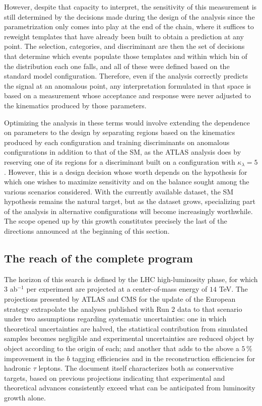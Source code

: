 However, despite that capacity to interpret, the sensitivity of this measurement is still determined by the decisions made during the design of the analysis since the parametrization only comes into play at the end of the chain, where it suffices to reweight templates that have already been built to obtain a prediction at any point. The selection, categories, and discriminant are then the set of decisions that determine which events populate those templates and within which bin of the distribution each one falls, and all of these were defined based on the standard model configuration. Therefore, even if the analysis correctly predicts the signal at an anomalous point, any interpretation formulated in that space is based on a measurement whose acceptance and response were never adjusted to the kinematics produced by those parameters.\medskip

Optimizing the analysis in these terms would involve extending the dependence on parameters to the design by separating regions based on the kinematics produced by each configuration and training discriminants on anomalous configurations in addition to that of the SM, as the ATLAS analysis does by reserving one of its regions for a discriminant built on a configuration with $\kappa_\lambda = 5$. However, this is a design decision whose worth depends on the hypothesis for which one wishes to maximize sensitivity and on the balance sought among the various scenarios considered. With the currently available dataset, the SM hypothesis remains the natural target, but as the dataset grows, specializing part of the analysis in alternative configurations will become increasingly worthwhile. The scope opened up by this growth constitutes precisely the last of the directions announced at the beginning of this section.

\subsection{The reach of the complete program}
\label{subsec:bbtt_prospects_hllhc}
The horizon of this search is defined by the LHC high-luminosity phase, for which $3$ ab$^{-1}$ per experiment are projected at a center-of-mass energy of $14$ TeV. The projections presented by ATLAS and CMS for the update of the European strategy \cite{ATLASCMS:2025HLLHC} extrapolate the analyses published with Run 2 data to that scenario under two assumptions regarding systematic uncertainties: one in which theoretical uncertainties are halved, the statistical contribution from simulated samples becomes negligible and experimental uncertainties are reduced object by object according to the origin of each; and another that adds to the above a $5\,\%$ improvement in the $b$ tagging efficiencies and in the reconstruction efficiencies for hadronic $\tau$ leptons. The document itself characterizes both as conservative targets, based on previous projections indicating that experimental and theoretical advances consistently exceed what can be anticipated from luminosity growth alone.

